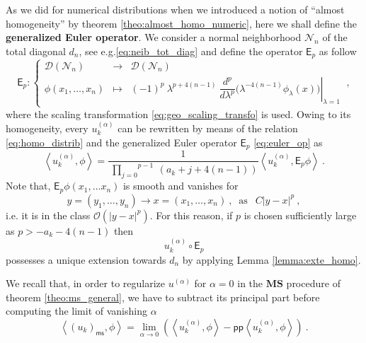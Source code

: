 \documentclass[11pt]{book}
\newcommand{\pp}{\mathsf{pp}}
\newcommand{\ms}{\mathsf{ms}}
\newcommand{\MS}{\textbf{MS}}
\newcommand{\sm}[1]{\left\langle#1\right\rangle}
\newcommand{\Dcal}{\mathcal{D}}
\newcommand{\Ncal}{\mathcal{N}}
\newcommand{\Ocal}{\mathcal{O}}
\newcommand{\Esf}{\mathsf{E}}
\theoremstyle{break}
\begin{document}
\bigskip


As we did for numerical distributions when we introduced a notion of ``almost homogeneity'' by theorem \ref{theo:almost_homo_numeric}, here we shall define the \textbf{generalized Euler operator}. We consider a normal neighborhood $\Ncal_n$ of the total diagonal $d_n$, see e.g.\eqref{eq:neib_tot_diag} and define the operator $\Esf_p$ as follow
%
\begin{equation}
\Esf_p : \left\{
\begin{array}{lcl}
\Dcal(\Ncal_n) & \to & \Dcal(\Ncal_n) \\
\phi(x_1,\dots, x_n) & \mapsto & \left. (-1)^p \ \lambda^{p+4(n-1)} \ \dfrac{d^p}{d\lambda^p} \bigg( \lambda^{-4(n-1)}  \phi_\lambda(x) \bigg) \right|_{\lambda = 1}
\end{array}
\right. \ ,
\label{eq:euler_op}
%
\end{equation}
%
where the scaling transformation \eqref{eq:geo_scaling_transfo} is used. Owing to its homogeneity, every $u^{(\alpha)}_k$ can be rewritten by means of the relation \eqref{eq:homo_distrib} and the generalized Euler operator $\Esf_p$ \eqref{eq:euler_op} as
%
\begin{equation}
\sm{ u^{(\alpha)}_k, \phi } = \frac{1}{\overset{p-1}{\ \underset{j=0}{\prod}} \ (a_k+j+4(n-1))}   \sm{ u^{(\alpha)}_k, \Esf_p \phi } \ .
\label{eq:expose_poles}
\end{equation}
%
Note that, $\Esf_p \phi(x_1, \dots x_n)$ is smooth and vanishes for
%
\begin{equation*}
y = (y_1 , \dots , y_n) \to x = (x_1, \dots , x_n) \ , \ \mbox{ as } \ \ C|y-x|^p \ , 
\end{equation*}
%
i.e. it is in the class $\Ocal(|y-x|^{p})$. For this reason, if  $p$ is chosen sufficiently large as $p > -a_k-4(n-1)$ then 
\begin{equation*}
u^{(\alpha)}_k \circ \Esf_p 
\end{equation*}
%
possesses a unique extension towards $d_n$ by applying Lemma \ref{lemma:exte_homo}. 


\bigskip


We recall that, in order to regularize $u^{(\alpha)}$ for $\alpha=0$ in the $\MS$ procedure of theorem \ref{theo:ms_general}, we have to subtract its principal part before computing the limit of vanishing $\alpha$
%
\begin{equation*}
\sm{ (u_k)_\ms, \phi } = \lim_{\alpha \to 0} \left( \sm{ u^{(\alpha)}_k, \phi } - \pp\sm{ u^{(\alpha)}_k , \phi } \right) \ .
\end{equation*}
\end{document}
